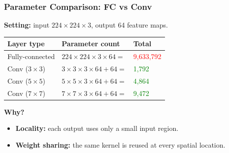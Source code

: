 \documentclass[notes,11pt, aspectratio=169]{beamer}
\begin{document}
\begin{frame}
\frametitle{Parameter Comparison: FC vs Conv}

\textbf{Setting:} input $224 \times 224 \times 3$, output 64 feature maps.

\vspace{6pt}
\renewcommand{\arraystretch}{1.5}
\begin{center}
\begin{tabular}{lll}
\toprule
\textbf{Layer type} & \textbf{Parameter count} & \textbf{Total} \\
\midrule
Fully-connected & $224 \times 224 \times 3 \times 64 = $ & \textcolor{red}{9,633,792} \\
Conv ($3 \times 3$) & $3 \times 3 \times 3 \times 64 + 64 = $ & \textcolor{green}{1,792} \\
Conv ($5 \times 5$) & $5 \times 5 \times 3 \times 64 + 64 = $ & \textcolor{green}{4,864} \\
Conv ($7 \times 7$) & $7 \times 7 \times 3 \times 64 + 64 = $ & \textcolor{green}{9,472} \\
\bottomrule
\end{tabular}
\end{center}

\vspace{8pt}
\begin{center}
\end{center}

\vspace{6pt}
\textbf{Why?}
\begin{itemize}
    \item \textbf{Locality:} each output uses only a small input region.
    \item \textbf{Weight sharing:} the same kernel is reused at every spatial location.
\end{itemize}
\end{frame}
\end{document}
